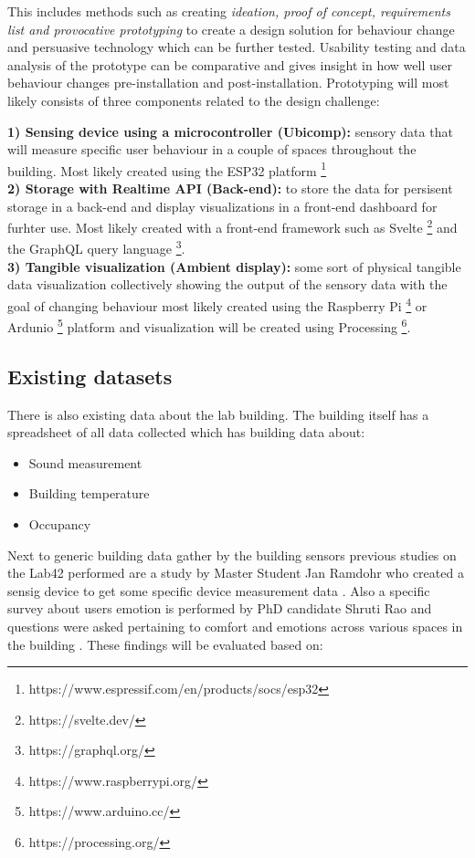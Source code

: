 This includes methods such as creating \emph{ideation, proof of concept, requirements list and provocative prototyping} to create a design solution for behaviour change and persuasive technology which can be further tested. Usability testing and data analysis of the prototype can be comparative and gives insight in how well user behaviour changes pre-installation and post-installation. Prototyping will most likely consists of three components related to the design challenge: 

\textbf{1) Sensing device using a microcontroller (Ubicomp): } sensory data that will measure specific user behaviour in a couple of spaces throughout the building. Most likely created using the ESP32 platform \footnote{https://www.espressif.com/en/products/socs/esp32} \\
\textbf{2) Storage with Realtime API (Back-end): } to store the data for persisent storage in a back-end and display visualizations in a front-end dashboard for furhter use. Most likely created with a front-end framework such as Svelte \footnote{https://svelte.dev/} and the GraphQL query language \footnote{https://graphql.org/}.\\
\textbf{3) Tangible visualization (Ambient display): } some sort of physical tangible data visualization collectively showing the output of the sensory data with the goal of changing behaviour most likely created using the Raspberry Pi \footnote{https://www.raspberrypi.org/} or Ardunio \footnote{https://www.arduino.cc/} platform and visualization will be created using Processing \footnote{https://processing.org/}.


\subsection{Existing datasets}

There is also existing data about the lab building. The building itself has a spreadsheet of all data collected which has building data about:

\begin{itemize}
  \item Sound measurement
  \item Building temperature
  \item Occupancy
\end{itemize}

Next to generic building data gather by the building sensors previous studies on the Lab42 performed are a study by Master Student Jan Ramdohr who created a sensig device to get some specific device measurement data \cite{sensing}. Also a specific survey about users emotion is performed by PhD candidate Shruti Rao and questions were asked pertaining to comfort and emotions across various spaces in the building \cite{emotion}. These findings will be evaluated based on:

